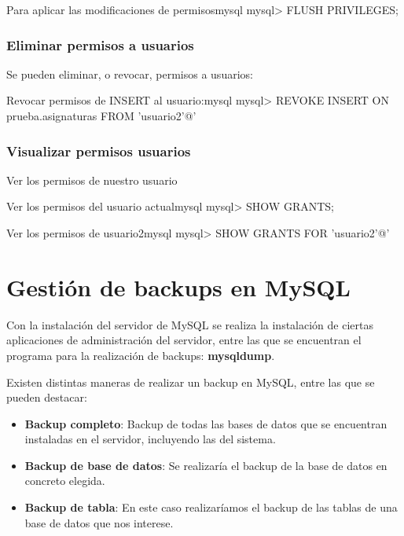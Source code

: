 \begin{mycode}{Para aplicar las modificaciones de permisos}{mysql}{}
mysql> FLUSH PRIVILEGES;
\end{mycode}


\subsection{Eliminar permisos a usuarios}
Se pueden eliminar, o revocar, permisos a usuarios:

\begin{mycode}{Revocar permisos de INSERT al usuario:}{mysql}{}
mysql> REVOKE INSERT ON prueba.asignaturas FROM 'usuario2'@'%
\end{mycode}


\subsection{Visualizar permisos usuarios}
Ver los permisos de nuestro usuario

\begin{mycode}{Ver los permisos del usuario actual}{mysql}{}
mysql> SHOW GRANTS;
\end{mycode}


\begin{mycode}{Ver los permisos de usuario2}{mysql}{}
mysql> SHOW GRANTS FOR 'usuario2'@'%
\end{mycode}


\chapter{Gestión de backups en MySQL}

Con la instalación del servidor de MySQL se realiza la instalación de ciertas aplicaciones de administración del servidor, entre las que se encuentran el programa para la realización de backups: \textbf{mysqldump}.

Existen distintas maneras de realizar un backup en MySQL, entre las que se pueden destacar:

\begin{itemize}
    \item \textbf{Backup completo}: Backup de todas las bases de datos que se encuentran instaladas en el servidor, incluyendo las del sistema.
    \item \textbf{Backup de base de datos}: Se realizaría el backup de la base de datos en concreto elegida.
    \item \textbf{Backup de tabla}: En este caso realizaríamos el backup de las tablas de una base de datos que nos interese.
\end{itemize}

